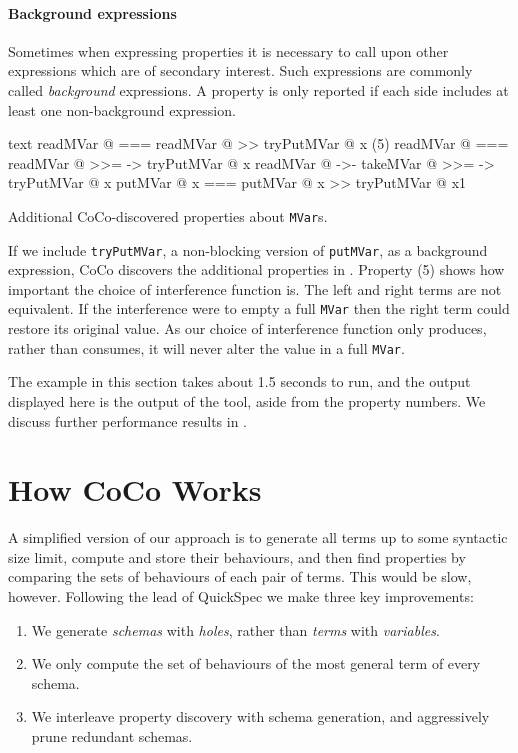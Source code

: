 \paragraph{Background expressions}
Sometimes when expressing properties it is necessary to call upon
other expressions which are of secondary interest.  Such expressions
are commonly called \emph{background} expressions.  A property is only
reported if each side includes at least one non-background expression.

\begin{listing}
\centering
\begin{cminted}{text}
      readMVar @  ===  readMVar @ >> tryPutMVar @ x
(5)   readMVar @  ===  readMVar @ >>= \x -> tryPutMVar @ x
      readMVar @  ->-  takeMVar @ >>= \x -> tryPutMVar @ x
     putMVar @ x  ===  putMVar @ x >> tryPutMVar @ x1
\end{cminted}
\caption{Additional CoCo-discovered properties about \texttt{MVar}s.}\label{lst:mvar_props2}
\end{listing}

If we include \verb|tryPutMVar|, a non-blocking version of
\verb|putMVar|, as a background expression, CoCo discovers the
additional properties in .  Property (5) shows
how important the choice of interference function is.  The left and
right terms are not equivalent.  If the interference were to empty a
full \verb|MVar| then the right term could restore its original value.
As our choice of interference function only produces, rather than
consumes, it will never alter the value in a full \verb|MVar|.

The example in this section takes about 1.5 seconds to run, and the
output displayed here is the output of the tool, aside from the
property numbers.  We discuss further performance results in
.

\section{How CoCo Works}
\label{sec:coco-hiw}

A simplified version of our approach is to generate all terms up to
some syntactic size limit, compute and store their behaviours, and
then find properties by comparing the sets of behaviours of each pair
of terms.  This would be slow, however.  Following the lead of
QuickSpec\cite{claessen2010,smallbone2017} we make three key
improvements:

\begin{enumerate}
\item We generate \emph{schemas} with \emph{holes}, rather than
  \emph{terms} with \emph{variables}.
\item We only compute the set of behaviours of the most general term
  of every schema.
\item We interleave property discovery with schema generation, and
  aggressively prune redundant schemas.
\end{enumerate}

